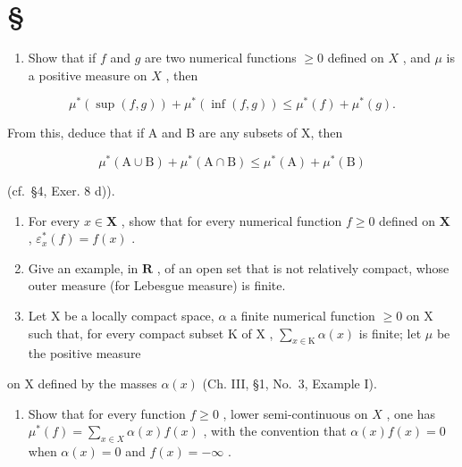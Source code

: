 \section*{\texorpdfstring{\S\CurrentExerciseGroup}{Section \CurrentExerciseGroup}}
{}

\begin{enumerate}
\def\labelenumi{\arabic{enumi})}
\tightlist
\item
  Show that if \(f\) and \(g\) are two numerical functions \(\geqslant 0\) defined on \(X\) , and \(\mu\) is a positive measure on \(X\) , then
\end{enumerate}

\[
\mu^ {*} (\sup (f, g)) + \mu^ {*} (\inf (f, g)) \leqslant \mu^ {*} (f) + \mu^ {*} (g).
\]

From this, deduce that if A and B are any subsets of X, then

\[
\mu^ {*} (\mathrm{A} \cup \mathrm{B}) + \mu^ {*} (\mathrm{A} \cap \mathrm{B}) \leqslant \mu^ {*} (\mathrm{A}) + \mu^ {*} (\mathrm{B})
\]

(cf.~§4, Exer. 8 d)).

\begin{enumerate}
\def\labelenumi{\arabic{enumi})}
\setcounter{enumi}{1}
\item
  For every \(x \in \mathbf{X}\) , show that for every numerical function \(f \geqslant 0\) defined on \(\mathbf{X}\) , \(\varepsilon_x^*(f) = f(x)\) .
\item
  Give an example, in \(\mathbf{R}\) , of an open set that is not relatively compact, whose outer measure (for Lebesgue measure) is finite.
\item
  Let \(\mathrm{X}\) be a locally compact space, \(\alpha\) a finite numerical function \(\geqslant 0\) on \(\mathrm{X}\) such that, for every compact subset \(\mathrm{K}\) of \(\mathrm{X}\) , \(\sum_{x\in \mathrm{K}}\alpha (x)\) is finite; let \(\mu\) be the positive measure
\end{enumerate}

on X defined by the masses \(\alpha(x)\) (Ch. III, §1, No.~3, Example I).

\begin{enumerate}
\def\labelenumi{\alph{enumi})}
\tightlist
\item
  Show that for every function \(f \geqslant 0\) , lower semi-continuous on \(X\) , one has \(\mu^{*}(f) = \sum_{x \in X} \alpha(x)f(x)\) , with the convention that \(\alpha(x)f(x) = 0\) when \(\alpha(x) = 0\) and \(f(x) = -\infty\) .
\end{enumerate}

